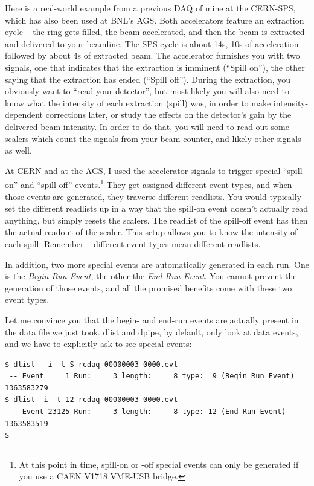 \documentclass{article}[11pt]
\begin{document}
Here is a real-world example from a previous DAQ of mine at the
CERN-SPS, which has also been used at BNL's AGS. Both accelerators
feature an extraction cycle -- the ring gets filled, the beam
accelerated, and then the beam is extracted and delivered to your
beamline. The SPS cycle is about 14s, 10s of acceleration followed by
about 4s of extracted beam. The accelerator furnishes you with two
signals, one that indicates that the extraction is imminent (``Spill
on''), the other saying that the extraction has ended (``Spill
off''). During the extraction, you obviously want to ``read your
detector'', but most likely you will also need to know what the
intensity of each extraction (spill) was, in order to make
intensity-dependent corrections later, or study the effects on the
detector's gain by the delivered beam intensity. In order to do that,
you will need to read out some scalers which count the signals from
your beam counter, and likely other signals as well.

At CERN and at the AGS, I used the accelerator signals to trigger
special ``spill on'' and ``spill off'' events.\footnote{At this point
  in time, spill-on or -off special events can only be generated if
  you use a CAEN V1718 VME-USB bridge.  } They get assigned different
event types, and when those events are generated, they traverse
different readlists. You would typically set the different readlists
up in a way that the spill-on event doesn't actually read anything,
but simply resets the scalers. The readlist of the spill-off event has
then the actual readout of the scaler.  This setup allows you to know
the intensity of each spill. Remember -- different event types mean
different readlists.

In addition, two more special events are automatically generated in
each run.  One is the \emph{Begin-Run Event}, the other the
\emph{End-Run Event}. You cannot prevent the generation of those
events, and all the promised benefits come with these two event types.

Let me convince you that the begin- and end-run events are actually present in
the data file we just took. dlist and dpipe, by default, only look at
data events, and we have to explicitly ask to see special events:

\begin{verbatim}
$ dlist  -i -t S rcdaq-00000003-0000.evt
 -- Event     1 Run:     3 length:     8 type:  9 (Begin Run Event)  1363583279
$ dlist -i -t 12 rcdaq-00000003-0000.evt
 -- Event 23125 Run:     3 length:     8 type: 12 (End Run Event)  1363583519
$ 
\end{verbatim}
\end{document}
